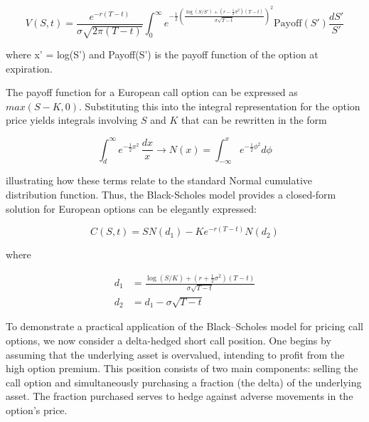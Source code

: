     \begin{equation}
        V(S,t) =
            \frac{e^{-r(T-t)}}{\sigma \sqrt{2 \pi (T-t)}}
            \int_{0}^{\infty} e^{-\frac{1}{2}\left(
                 \frac{\log(S/S') + (r - \frac{1}{2}\sigma^2)(T-t)}{\sigma \sqrt{T-t}}
            \right)^2}
            \text{Payoff}(S') \frac{dS'}{S'}
        \label{eq:bs_solution_integral}
    \end{equation}

    where x' = log(S') and Payoff(S') is the payoff function of the option at expiration.

    The payoff function for a European call option can be expressed as $max(S - K, 0)$.
    Substituting this into the integral representation for the option price yields integrals involving $S$ and $K$
    that can be rewritten in the form

    \begin{equation}
        \int_{d}^{\infty} e^{-\tfrac{1}{2} x^2} \,\frac{dx}{x}
            \longrightarrow
            N(x) = \int_{-\infty}^{x} e^{-\tfrac{1}{2} \phi^2} d\phi
        \label{eq:form_integral}
    \end{equation}

    illustrating how these terms relate to the standard Normal cumulative distribution function.
    Thus, the Black-Scholes model provides a closed-form solution for European options can be elegantly expressed:

    \begin{equation}
        C(S,t) = S N(d_1) - K e^{-r(T-t)} N(d_2)
        \label{eq:bs_solution}
    \end{equation}

    where

    \begin{equation}
        \begin{aligned}
            d_1 &= \frac{\log(S/K) + (r + \tfrac{1}{2}\sigma^2)(T-t)}{\sigma \sqrt{T-t}} \\
            d_2 &= d_1 - \sigma \sqrt{T-t}
        \end{aligned}
        \label{eq:bs_d1_d2}
    \end{equation}

    To demonstrate a practical application of the Black--Scholes model for pricing call options,
    we now consider a delta-hedged short call position.
    One begins by assuming that the underlying asset is overvalued, intending to profit from the high option premium.
    This position consists of two main components:
    selling the call option and simultaneously purchasing a fraction (the delta) of the underlying asset.
    The fraction purchased serves to hedge against adverse movements in the option’s price.

